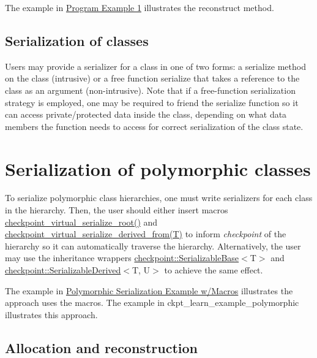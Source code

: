 The example in \hyperlink{ckpt_learn_ex1}{Program Example 1} illustrates the reconstruct method.\hypertarget{ckpt_learn_serialize_serialize_class}{}\subsection{Serialization of classes}\label{ckpt_learn_serialize_serialize_class}
Users may provide a serializer for a class in one of two forms\+: a {\ttfamily serialize} method on the class (intrusive) or a free function {\ttfamily serialize} that takes a reference to the class as an argument (non-\/intrusive). Note that if a free-\/function serialization strategy is employed, one may be required to friend the serialize function so it can access private/protected data inside the class, depending on what data members the function needs to access for correct serialization of the class state.\hypertarget{ckpt_learn_serialize_serialize_polymorphic}{}\section{Serialization of polymorphic classes}\label{ckpt_learn_serialize_serialize_polymorphic}
To serialize polymorphic class hierarchies, one must write serializers for each class in the hierarchy. Then, the user should either insert macros {\ttfamily \hyperlink{lib_2checkpoint_2src_2checkpoint_2dispatch_2vrt_2base_8h_aa6062a11e9781a28fe043f10338238df}{checkpoint\+\_\+virtual\+\_\+serialize\+\_\+root()}} and {\ttfamily \hyperlink{derived_8h_acc015406441054fae32d63af2b86ca0d}{checkpoint\+\_\+virtual\+\_\+serialize\+\_\+derived\+\_\+from(\+T)}} to inform {\itshape checkpoint} of the hierarchy so it can automatically traverse the hierarchy. Alternatively, the user may use the inheritance wrappers {\ttfamily \hyperlink{namespacecheckpoint_ae8adefa66d7575697f8e465bed48e3cc}{checkpoint\+::\+Serializable\+Base}$<$T$>$} and {\ttfamily \hyperlink{namespacecheckpoint_a9c4afb2c8d1bc1f58b9e158d64331d65}{checkpoint\+::\+Serializable\+Derived}$<$T, U$>$} to achieve the same effect.

The example in \hyperlink{ckpt_learn_ex6_polymorphic_macro}{Polymorphic Serialization Example w/\+Macros} illustrates the approach uses the macros. The example in ckpt\+\_\+learn\+\_\+example\+\_\+polymorphic illustrates this approach.\hypertarget{ckpt_learn_serialize_serialize_polymorphic_step}{}\subsection{Allocation and reconstruction}\label{ckpt_learn_serialize_serialize_polymorphic_step}

